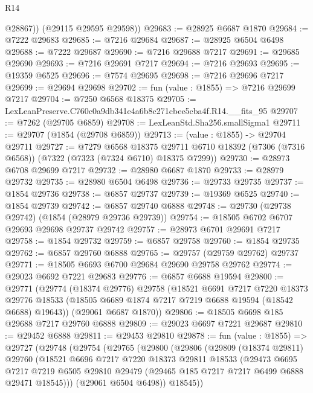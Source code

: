 \begin{lexlean}{R14}
\begin{coremodule}
          @28867))
      (@29115 @29595 @29598))
@29683 := @28925 @6687 @1870
@29684 := @7222 @29683
@29685 := @7216 @29684
@29687 := @28925 @6504 @6498
@29688 := @7222 @29687
@29690 := @7216 @29688 @7217
@29691 := @29685 @29690
@29693 := @7216 @29691 @7217
@29694 := @7216 @29693
@29695 := @19359 @6525
@29696 := @7574 @29695
@29698 := @7216 @29696 @7217
@29699 := @29694 @29698
@29702 := fun (value : @1855) => @7216 @29699 @7217
@29704 := @7250 @6568 @18375
@29705 := LexLeanPreserve.C760c0a9db341e4a6b8c271cbee5cba4f.R14.__fits_95
@29707 := @7262 (@29705 @6859)
@29708 := LexLeanStd.Sha256.smallSigma1
@29711 := @29707 (@1854 (@29708 @6859))
@29713 := (value : @1855) -> @29704 @29711
@29727 := @7279
    @6568
    @18375
    @29711
    @6710
    @18392
    (@7306 (@7316 @6568))
    (@7322 (@7323 (@7324 @6710) @18375 @7299))
@29730 := @28973 @6708 @29699 @7217
@29732 := @28980 @6687 @1870
@29733 := @28979 @29732
@29735 := @28980 @6504 @6498
@29736 := @29733 @29735
@29737 := @1854 @29736
@29738 := @6857 @29737
@29739 := @19369 @6525
@29740 := @1854 @29739
@29742 := @6857 @29740 @6888
@29748 := @29730 (@29738 @29742) (@1854 (@28979 @29736 @29739))
@29754 := @18505 @6702 @6707 @29693 @29698 @29737 @29742
@29757 := @28973 @6701 @29691 @7217
@29758 := @1854 @29732
@29759 := @6857 @29758
@29760 := @1854 @29735
@29762 := @6857 @29760 @6888
@29765 := @29757 (@29759 @29762) @29737
@29771 := @18505 @6693 @6700 @29684 @29690 @29758 @29762
@29774 := @29023 @6692 @7221 @29683
@29776 := @6857 @6688 @19594
@29800 := @29771
    (@29774
      (@18374 @29776)
      @29758
      (@18521
        @6691
        @7217
        @7220
        @18373
        @29776
        @18533
        (@18505 @6689 @1874 @7217 @7219 @6688 @19594 (@18542 @6688) @19643))
      (@29061 @6687 @1870))
@29806 := @18505 @6698 @185 @29688 @7217 @29760 @6888
@29809 := @29023 @6697 @7221 @29687
@29810 := @29452 @6888
@29811 := @29453 @29810
@29878 := fun (value : @1855) =>
  @29727
    (@29748
      (@29754
        (@29765
          (@29800
            (@29806
              (@29809
                (@18374 @29811)
                @29760
                (@18521
                  @6696
                  @7217
                  @7220
                  @18373
                  @29811
                  @18533
                  (@29473
                    @6695
                    @7217
                    @7219
                    @6505
                    @29810
                    @29479
                    (@29465 @185 @7217 @7217 @6499 @6888 @29471 @18545)))
                (@29061 @6504 @6498))
              @18545))

\end{coremodule}
\end{lexlean}
